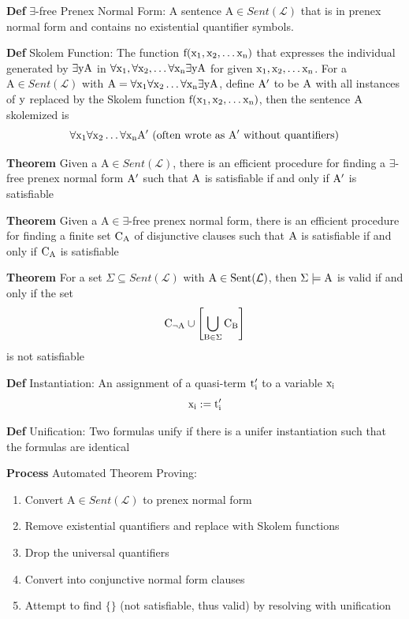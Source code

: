 \documentclass[11pt,notitlepage]{report}
\newcommand{\mc}[1]{\ensuremath{\mathcal{#1}}}
\newcommand{\mr}[1]{\ensuremath{\mathrm{#1}}}
\newcommand{\tbf}[1]{\textbf{#1}}
\begin{document}
\tbf{Def} $\exists$-free Prenex Normal Form: A sentence $\mr{A} \in Sent(\mc L)$ that is in prenex normal form and contains no existential quantifier symbols.

\tbf{Def} Skolem Function: The function $\rm f(x_1, x_2, \dots x_n)$ that expresses the individual generated by $\rm \exists yA$ in $\rm \forall x_1, \forall x_2, \dots \forall x_n \exists y A$ for given $\rm x_1, x_2, \dots x_n$. For a $\mr{A} \in Sent(\mc L)$ with $\rm A = \forall x_1 \forall x_2 \dots \forall x_n \exists y A$, define $\rm A'$ to be $\rm A$ with all instances of $\rm y$ replaced by the Skolem function $\rm f(x_1, x_2, \dots x_n)$, then the sentence $\rm A$ skolemized is
$$\rm \forall x_1 \forall x_2 \dots \forall x_n A' \text{ (often wrote as $\rm A'$ without quantifiers)}$$

\tbf{Theorem} Given a $\mr{A} \in Sent(\mc L)$, there is an efficient procedure for finding a $\exists$-free prenex normal form $\rm A'$ such that $\rm A$ is satisfiable if and only if $\rm A'$ is satisfiable

\tbf{Theorem} Given a $\mr{A} \in \exists$-free prenex normal form, there is an efficient procedure for finding a finite set $\rm C_A$ of disjunctive clauses such that $\rm A$ is satisfiable if and only if $\rm C_A$ is satisfiable 

\tbf{Theorem} For a set $\Sigma \subseteq Sent(\mc L)$ with $\rm A \in Sent(\mc L)$, then $\Sigma \models \rm A$ is valid if and only if the set
$$\rm C_{\neg A} \cup \left[\bigcup_{B \in \Sigma} C_B\right]$$
is not satisfiable

\tbf{Def} Instantiation: An assignment of a quasi-term $\rm t_i'$ to a variable $\rm x_i$
$$\rm x_i := t_i'$$

\tbf{Def} Unification: Two formulas unify if there is a unifer instantiation such that the formulas are identical

\tbf{Process} Automated Theorem Proving:
\vspace{-3mm}
\begin{enumerate}
    \item Convert $\mr{A} \in Sent(\mc L)$ to prenex normal form
    \item Remove existential quantifiers and replace with Skolem functions
    \item Drop the universal quantifiers
    \item Convert into conjunctive normal form clauses
    \item Attempt to find $\{\}$ (not satisfiable, thus valid) by resolving with unification
\end{enumerate}
\end{document}

